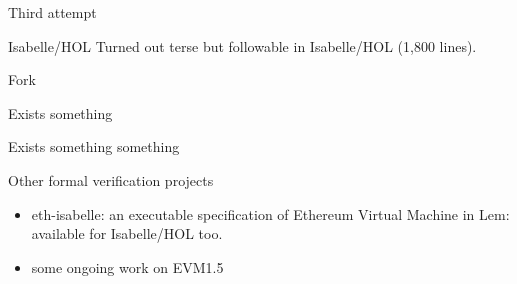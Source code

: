 \documentclass{beamer}
\begin{document}
\begin{frame}{Third attempt}
\end{frame}

\begin{frame}{Isabelle/HOL}
\alert{Turned out terse but followable in Isabelle/HOL (1,800 lines).}

\end{frame}

\begin{frame}{Fork}
\end{frame}

\begin{frame}{Exists something}
\end{frame}

\begin{frame}{Exists something something}
\end{frame}


\begin{frame}{Other formal verification projects}

\begin{itemize}
\item eth-isabelle: an executable specification of Ethereum Virtual Machine in Lem: available for Isabelle/HOL too.
\item some ongoing work on EVM1.5
\end{itemize}


\end{frame}
\end{document}
